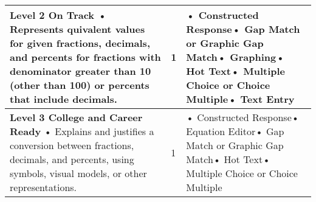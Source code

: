 \documentclass[11pt, English]{article}
\begin{document}
\begin{longtable}{|p{11.0cm}|p{1.8cm}|p{3.7cm}|}
\textbf{Level 2 On Track}\newline
• Represents quivalent values for given fractions, decimals, and percents for fractions with denominator greater than 10 (other than 100) or percents that include decimals. \newline

 & \hfil{1}
 &• Constructed Response\newline• Gap Match or Graphic Gap Match\newline• Graphing\newline• Hot Text\newline• Multiple Choice or Choice Multiple\newline• Text Entry\\
\hline


 
\textbf{Level 3 College and Career Ready}\newline
• Explains and justifies a conversion between fractions, decimals, and percents, using symbols, visual models, or other representations.\newline

& \hfil{1}
&• Constructed Response\newline• Equation Editor\newline• Gap Match or Graphic Gap Match\newline• Hot Text\newline• Multiple Choice or Choice Multiple\\
\hline 


\end{longtable}
\end{document}
